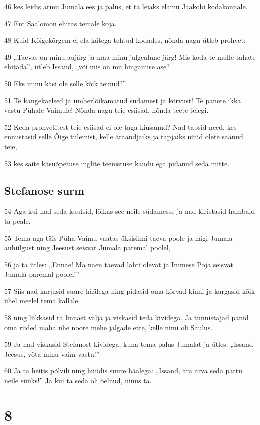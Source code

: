 \par 46 kes leidis armu Jumala ees ja palus, et ta leiaks elamu Jaakobi kodakonnale.
\par 47 Ent Saalomon ehitas temale koja.
\par 48 Kuid Kõigekõrgem ei ela kätega tehtud kodades, nõnda nagu ütleb prohvet:
\par 49 „Taevas on minu aujärg ja maa minu jalgealune järg! Mis koda te mulle tahate ehitada”, ütleb Issand, „või mis on mu hingamise ase?
\par 50 Eks minu käsi ole selle kõik teinud?”
\par 51 Te kangekaelsed ja ümberlõikamatud südamest ja kõrvust! Te panete ikka vastu Pühale Vaimule! Nõnda nagu teie esiisad, nõnda teete teiegi.
\par 52 Keda prohvetitest teie esiisad ei ole taga kiusanud? Nad tapsid need, kes ennustasid selle Õige tulemist, kelle äraandjaiks ja tapjaiks nüüd olete saanud teie,
\par 53 kes saite käsuõpetuse inglite teenistuse kaudu ega pidanud seda mitte.

\section*{Stefanose surm}

\par 54 Aga kui nad seda kuulsid, lõikas see neile südamesse ja nad kiristasid hambaid ta peale.
\par 55 Tema aga täis Püha Vaimu vaatas üksisilmi taeva poole ja nägi Jumala auhiilgust ning Jeesust seisvat Jumala paremal poolel,
\par 56 ja ta ütles: „Ennäe! Ma näen taevad lahti olevat ja Inimese Poja seisvat Jumala paremal poolel!”
\par 57 Siis nad karjusid suure häälega ning pidasid oma kõrvad kinni ja kargasid kõik ühel meelel tema kallale
\par 58 ning lükkasid ta linnast välja ja viskasid teda kividega. Ja tunnistajad panid oma riided maha ühe noore mehe jalgade ette, kelle nimi oli Saulus.
\par 59 Ja nad viskasid Stefanost kividega, kuna tema palus Jumalat ja ütles: „Issand Jeesus, võta minu vaim vastu!”
\par 60 Ja ta heitis põlvili ning hüüdis suure häälega: „Issand, ära arva seda pattu neile süüks!” Ja kui ta seda oli öelnud, uinus ta.


\chapter{8}

